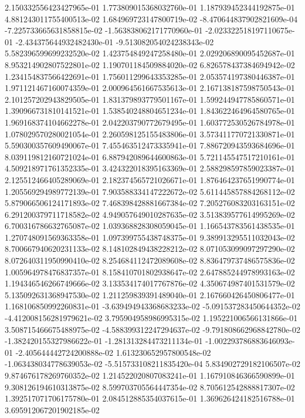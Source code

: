 2.150332556423427965e-01
1.773809015368032760e-01
1.187939452344192875e-01
4.881243011755400513e-02
1.684969723147800719e-02
-8.470644837902821609e-04
-7.225733665631858815e-02
-1.563838062171770960e-01
-2.023322518197110675e-01
-2.434375644932482430e-01
-9.513082054024238343e-02
5.582396599699232520e-02
1.423754849247258480e-01
2.029206890095452687e-01
8.953214902807522801e-02
1.190701184509884020e-02
6.826578437384694942e-02
1.234154837566422691e-01
1.756011299643353285e-01
2.053574197380446387e-01
1.971121467160074359e-01
2.000964561667535613e-01
2.167138187598750543e-01
2.101257202943829505e-01
1.831379893779501167e-01
1.599244947785860571e-01
1.390966731810141521e-01
1.538540248804651234e-01
1.843622464964580765e-01
1.969168374104662278e-01
2.042203790772679495e-01
1.603772530526784978e-01
1.078029570280021054e-01
2.260598125155483806e-01
3.573411770721330871e-01
5.590300357609490067e-01
7.455463512473335941e-01
7.886720943593684696e-01
8.039119812160721024e-01
6.887942089644600863e-01
5.721145547517210161e-01
4.509218971761352335e-01
3.424322018395163369e-01
2.588298597859023387e-01
2.125512466405289069e-01
2.182374565721026671e-01
1.876464237651990774e-01
1.205569294989772139e-01
7.903588334147222672e-02
5.611445857884268112e-02
5.879066506124171893e-02
7.468398428881667384e-02
7.205276083203163151e-02
6.291200379711718582e-02
4.949057649010287635e-02
3.513839577614995269e-02
6.700316786632765087e-02
1.039368828308059045e-01
1.166543783561438535e-01
1.270748091569363358e-01
1.097399755438748375e-01
9.389913295511032043e-02
8.700667940620231133e-02
8.148102849438228212e-02
8.071053099097297290e-02
8.072640311950990410e-02
8.254684112472089608e-02
8.836479737486575836e-02
1.005964978476837357e-01
8.158410701802938647e-02
2.647885244978993163e-02
1.194346546266749666e-02
3.133534174017767876e-02
4.350674987401531579e-02
5.135092631368947530e-02
1.211259839391489040e-01
2.167660426450806477e-01
1.168106850992260831e-01
-3.639494943368683233e-02
-5.091537283450644352e-02
-4.412008156281979621e-02
3.795904958986995315e-02
1.195221006566131866e-01
3.508715466675488975e-02
-4.588399312247294637e-02
-9.791808662968842780e-02
-1.382420155327986622e-01
-1.281313284473211134e-01
-1.002293786883646093e-01
-2.405644442724200888e-02
1.613230652957800548e-02
-1.063438034778639053e-02
-5.515733108211835420e-04
5.834902729182106507e-02
9.874676178269760352e-02
1.214522020807083241e-01
1.167910846366590899e-01
9.308126194610313875e-02
8.599703705564447354e-02
8.705612542888817307e-02
1.392517071706175780e-01
2.084512885354037615e-01
1.369626424182516788e-01
3.695912067201902185e-02
